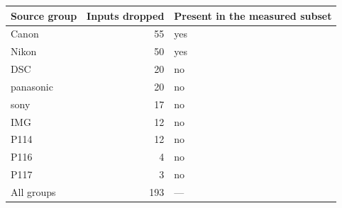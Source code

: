\begin{tabular}{lrl}
\toprule
Source group & Inputs dropped & Present in the measured subset \\
\midrule
Canon & 55 & yes \\
Nikon & 50 & yes \\
DSC & 20 & no \\
panasonic & 20 & no \\
sony & 17 & no \\
IMG & 12 & no \\
P114 & 12 & no \\
P116 & 4 & no \\
P117 & 3 & no \\
\midrule
All groups & 193 & --- \\
\bottomrule
\end{tabular}
